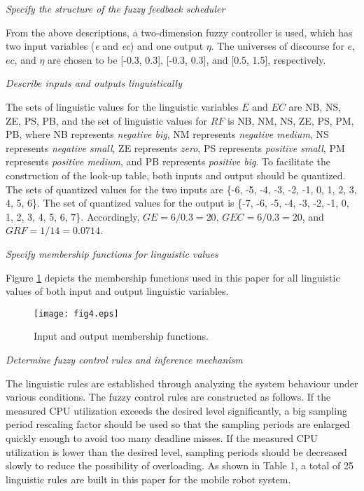 \documentclass[12pt,a4paper]{ijicic}
\begin{document}
\begin{asparaenum}
\item \emph{Specify the structure of the fuzzy feedback scheduler}

From the above descriptions, a two-dimension fuzzy controller is
used, which has two input variables (\emph{e} and \emph{ec}) and one
output $\eta$. The universes of discourse for $e$, $ec$, and $\eta$
are chosen to be [-0.3, 0.3], [-0.3, 0.3], and [0.5, 1.5],
respectively.

\item \emph{Describe inputs and outputs linguistically}

The sets of linguistic values for the linguistic variables $E$ and
$EC$ are {NB, NS, ZE, PS, PB}, and the set of linguistic values for
$RF$ is {NB, NM, NS, ZE, PS, PM, PB}, where NB represents
\emph{negative big}, NM represents \emph{negative medium}, NS
represents \emph{negative small}, ZE represents \emph{zero}, PS
represents \emph{positive small}, PM represents \emph{positive
medium}, and PB represents \emph{positive big}. To facilitate the
construction of the look-up table, both inputs and output should be
quantized. The sets of quantized values for the two inputs are \{-6,
-5, -4, -3, -2, -1, 0, 1, 2, 3, 4, 5, 6\}. The set of quantized
values for the output is \{-7, -6, -5, -4, -3, -2, -1, 0, 1, 2, 3,
4, 5, 6, 7\}. Accordingly, $GE = 6/0.3 = 20$, $GEC = 6/0.3 = 20$,
and $GRF = 1/14 = 0.0714$.
\item \emph{Specify membership functions for linguistic values}

Figure \ref{fig4} depicts the membership functions used in this
paper for all linguistic values of both input and output linguistic
variables.
\begin{figure}[htb!]
\begin{center}
\texttt{[image: fig4.eps]}
\caption{Input and output membership functions.}
\label{fig4}
\end{center}
\end{figure}

\item \emph{Determine fuzzy control rules and inference mechanism}

The linguistic rules are established through analyzing the system
behaviour under various conditions. The fuzzy control rules are
constructed as follows. If the measured CPU utilization exceeds the
desired level significantly, a big sampling period rescaling factor
should be used so that the sampling periods are enlarged quickly enough
to avoid too many deadline misses. If the measured CPU utilization
is lower than the desired level, sampling periods should be
decreased slowly to reduce the possibility of overloading. As shown
in Table 1, a total of 25 linguistic rules are built in this paper
for the mobile robot system.


\end{asparaenum}
\end{document}
